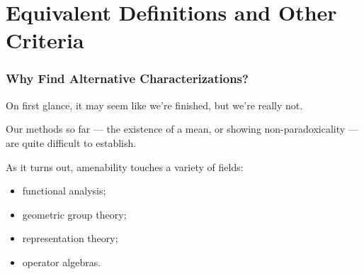 \documentclass{beamer-custom}
\begin{document}
\section{Equivalent Definitions and Other Criteria}%
\begin{frame}
  \frametitle{Why Find Alternative Characterizations?}
  On first glance, it may seem like we're finished, but we're really not.\pause\newline

  Our methods so far --- the existence of a mean, or showing non-paradoxicality --- are quite difficult to establish.\pause\newline

  As it turns out, amenability touches a variety of fields:
  \begin{itemize}
    \item functional analysis;
    \item geometric group theory;
    \item representation theory;
    \item operator algebras.
  \end{itemize}
\end{frame}
\end{document}

